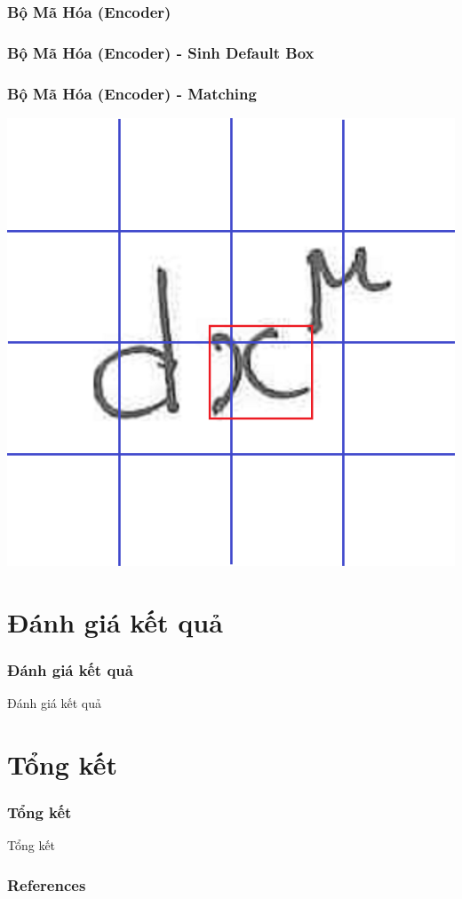 \documentclass{beamer}
\begin{document}
\subsubsection{Bộ Mã Hóa (Encoder)}
\begin{frame}
\frametitle{Bộ Mã Hóa (Encoder) - Sinh Default Box}

\end{frame}


\begin{frame}
\frametitle{Bộ Mã Hóa (Encoder) - Matching}


\begin{center}
\centering
\includegraphics[width=0.6\linewidth]{GT.png}
\end{center}

\end{frame}


\section{Đánh giá kết quả}
\begin{frame}
\frametitle{Đánh giá kết quả}
{\Huge Đánh giá kết quả}
\end{frame}

\section{Tổng kết}
\begin{frame}
\frametitle{Tổng kết}
{\Huge Tổng kết}
\end{frame}

\begin{frame}
\frametitle{References}
\newpage
%
%
\printbibliography
\end{frame}



\begin{frame}
\Huge{}
\end{frame}

\end{document}
